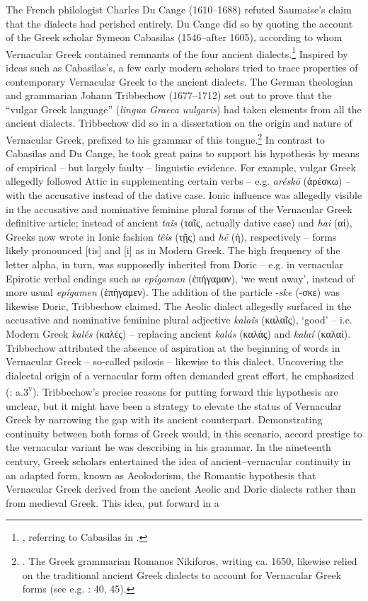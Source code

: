 The French philologist Charles Du Cange (1610–1688) refuted Saumaise’s claim that the dialects had perished entirely. Du Cange did so by quoting the account of the Greek scholar Symeon Cabasilas (1546–after 1605), according to whom Vernacular Greek contained remnants of the four ancient dialects.\footnote{ \citet[viii]{Du1688}, referring to Cabasilas in \citet[462]{Crusius1584}.} Inspired by ideas such as Cabasilas’s, a few early modern scholars tried to trace properties of contemporary Vernacular Greek to the ancient dialects. The German theologian and grammarian Johann Tribbechow (1677–1712) set out to prove that the “vulgar Greek language” (\textit{lingua Graeca uulgaris}) had taken elements from all the ancient dialects. Tribbechow did so in a dissertation on the origin and nature of Vernacular Greek, prefixed to his grammar of this tongue.\footnote{\citet[a.3\textsc{\textsuperscript{r}}]{Tribbechow1705}. The Greek grammarian Romanos Nikiforos, writing ca. 1650, likewise relied on the traditional ancient Greek dialects to account for Vernacular Greek forms (see e.g. \citealt{Nikiforos1908}: 40, 45).} In contrast to Cabasilas and Du Cange, he took great pains to support his hypothesis by means of empirical – but largely faulty – linguistic evidence. For example, vulgar Greek allegedly followed Attic in supplementing certain verbs – e.g. \textit{aréskō} (ἀρέσκω) – with the accusative instead of the dative case. Ionic influence was allegedly visible in the accusative and nominative feminine plural forms of the Vernacular Greek definitive article; instead of ancient \textit{taîs} (ταῖς, actually dative case) and \textit{hai} (αἱ), Greeks now wrote in Ionic fashion \textit{têis} (τῇς) and \textit{hē} (ἡ), respectively – forms likely pronounced [tis] and [i] as in Modern Greek. The high frequency of the letter alpha, in turn, was supposedly inherited from Doric – e.g. in vernacular Epirotic verbal endings such as \textit{epígaman} (ἐπήγαμαν), ‘we went away’, instead of more usual \textit{epígamen} (ἐπήγαμεν). The addition of the particle -\textit{ske} (-σκε) was likewise Doric, Tribbechow claimed. The Aeolic dialect allegedly surfaced in the accusative and nominative feminine plural adjective \textit{kalaîs} (καλαῖς), ‘good’ – i.e. Modern Greek \textit{kalés} (καλές) – replacing ancient \textit{kalás} (καλάς) and \textit{kalaí} (καλαί). Tribbechow attributed the absence of aspiration at the beginning of words in Vernacular Greek – so-called psilosis – likewise to this dialect. Uncovering the dialectal origin of a vernacular form often demanded great effort, he emphasized (\citealt{Tribbechow1705}: a.3\textsc{\textsuperscript{v}}). Tribbechow’s precise reasons for putting forward this hypothesis are unclear, but it might have been a strategy to elevate the status of Vernacular Greek by narrowing the gap with its ancient counterpart. Demonstrating continuity between both forms of Greek would, in this scenario, accord prestige to the vernacular variant he was describing in his grammar. In the nineteenth century, Greek scholars entertained the idea of ancient–vernacular continuity in an adapted form, known as Aeolodorism, the Romantic hypothesis that Vernacular Greek derived from the ancient Aeolic and Doric dialects rather than from medieval Greek. This idea, put forward in a 